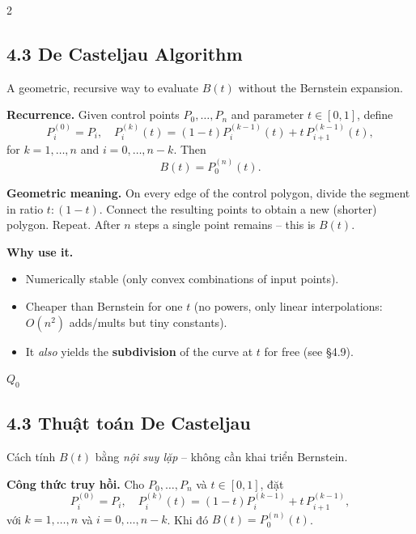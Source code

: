 \begin{paracol}{2}
\subsection*{4.3 De Casteljau Algorithm}

A geometric, recursive way to evaluate $B(t)$ without the Bernstein expansion.

\textbf{Recurrence.} Given control points $P_0,\dots,P_n$ and parameter $t\in[0,1]$, define
\[
P_i^{(0)}=P_i,\quad
P_i^{(k)}(t)=(1-t)P_i^{(k-1)}(t)+t\,P_{i+1}^{(k-1)}(t),
\]
for $k=1,\dots,n$ and $i=0,\dots,n-k$. Then
\[
B(t)=P_0^{(n)}(t).
\]

\textbf{Geometric meaning.} On every edge of the control polygon, divide the segment in ratio $t:(1{-}t)$. Connect the resulting points to obtain a new (shorter) polygon. Repeat. After $n$ steps a single point remains -- this is $B(t)$.

\textbf{Why use it.}
\begin{itemize}[leftmargin=*,nosep]
  \item Numerically stable (only convex combinations of input points).
  \item Cheaper than Bernstein for one $t$ (no powers, only linear interpolations: $O(n^{2})$ adds/mults but tiny constants).
  \item It \emph{also} yields the \textbf{subdivision} of the curve at $t$ for free (see \S 4.9).
\end{itemize}

\begin{algorithm}[H]
\small
\DontPrintSemicolon
{}
\Return $Q_0$\;
\caption{De Casteljau (curve)}
\end{algorithm}

\switchcolumn

\subsection*{4.3 Thuật toán De Casteljau}

Cách tính $B(t)$ bằng \emph{nội suy lặp} -- không cần khai triển Bernstein.

\textbf{Công thức truy hồi.} Cho $P_0,\dots,P_n$ và $t\in[0,1]$, đặt
\[
P_i^{(0)}=P_i,\quad
P_i^{(k)}(t)=(1-t)P_i^{(k-1)}+t\,P_{i+1}^{(k-1)},
\]
với $k=1,\dots,n$ và $i=0,\dots,n-k$. Khi đó $B(t)=P_0^{(n)}(t)$.


\end{paracol}
